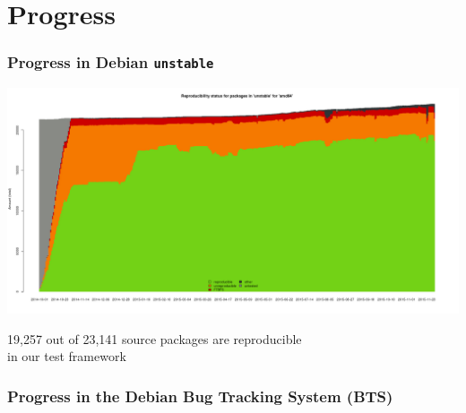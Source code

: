 \documentclass[14pt]{beamer}
\begin{document}
\section{Progress}

\begin{frame}[plain]
 \frametitle{Progress in Debian \texttt{unstable}}
 \begin{center}
  \includegraphics[height=0.73\paperheight]{images/stats_pkg_state.png}

  \footnotesize{19,257 out of 23,141 source packages are reproducible \\
    in our test framework}
  \vfill
 \end{center}
\end{frame}


\begin{frame}[plain]
 \frametitle{Progress in the Debian Bug Tracking System (BTS)}
\end{frame}
\end{document}
